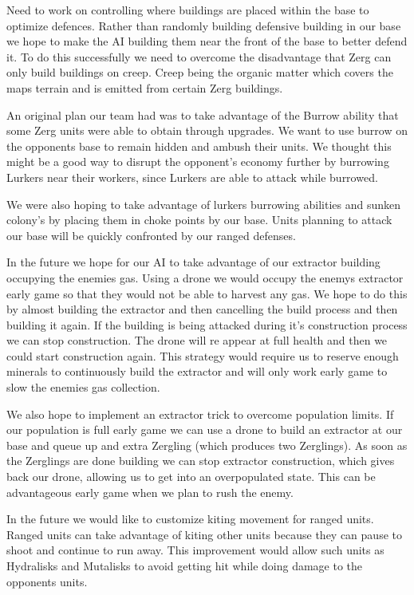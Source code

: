 \documentclass{article}
\begin{document}
Need to work on controlling where buildings are placed within the base to optimize defences. Rather than randomly building defensive building in our base we hope to make the AI building them near the front of the base to better defend it. To do this successfully we need to overcome the disadvantage that Zerg can only build buildings on creep. Creep being the organic matter which covers the maps terrain and is emitted from certain Zerg buildings.

An original plan our team had was to take advantage of the Burrow ability that some Zerg units were able to obtain through upgrades. We want to use burrow on the opponents base to remain hidden and ambush their units. We thought this might be a good way to disrupt the opponent's economy further by burrowing Lurkers near their workers, since Lurkers are able to attack while burrowed.

We were also hoping to take advantage of lurkers burrowing abilities and sunken colony’s by placing them in choke points by our base. Units planning to attack our base will be quickly confronted by our ranged defenses.

In the future we hope for our AI to take advantage of our extractor building occupying the enemies gas. Using a drone we would occupy the enemys extractor early game so that they would not be able to harvest any gas. We hope to do this by almost building the extractor and then cancelling the build process and then building it again. If the building is being attacked during it’s construction process we can stop construction. The drone will re appear at full health and then we could start construction again. This strategy would require us to reserve enough minerals to continuously build the extractor and will only work early game to slow the enemies gas collection. 

We also hope to implement an extractor trick to overcome population limits. If our population is full early game we can use a drone to build an extractor at our base and queue up and extra Zergling (which produces two Zerglings). As soon as the Zerglings are done building we can stop extractor construction, which gives back our drone, allowing us to get into an overpopulated state. This can be advantageous early game when we plan to rush the enemy.

In the future we would like to customize kiting movement for ranged units. Ranged units can take advantage of kiting other units because they can pause to shoot and continue to run away. This improvement would allow such units as Hydralisks and Mutalisks to avoid getting hit while doing damage to the opponents units. 
\end{document}

